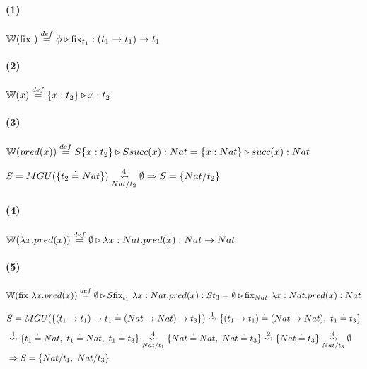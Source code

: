 \documentclass[10pt,a4paper]{article}
\begin{document}
\vspace*{5mm}
\begin{multicols}{2}
\paragraph{(1)} $\WFunc(\lambdaFix{}) \equalDef \judgeType{\phi}{\text{fix}_{t_1}}{(t_1\to t_1)\to t_1}$

\paragraph{(2)} $\WFunc(x) \equalDef \judgeType{\{x:t_2\}}{x}{t_2}$

\end{multicols}


\paragraph{(3)} $\WFunc(pred(x)) \equalDef \judgeType{S\{x:t_2\}}{Ssucc(x)}{Nat} = \judgeType{\{x:Nat\}}{succ(x)}{Nat}$

\vspace*{5mm}
$S = MGU(\{t_2\equalDot Nat\}) \goesTo{4}{Nat/t_2}  \emptyset \Rightarrow S=\{Nat/t_2\}$

\paragraph{(4)} 
$\WFunc(\lambdaAbsI{x}{pred(x)})
\equalDef \judgeType{\emptyset}{\lambdaAbs{x}{Nat}{pred(x)}}{Nat\to Nat}$

\paragraph{(5)}$
\WFunc(\lambdaFix{\lambdaAbsI{x}{pred(x)}})
\equalDef \judgeType{\emptyset}{S\text{fix}_{t_1}~\lambdaAbs{x}{Nat}{pred(x)}}{St_3} = \judgeType{\emptyset}{\text{fix}_{Nat}~\lambdaAbs{x}{Nat}{pred(x)}}{Nat}
$

\begin{align*}
\vspace*{5mm}
&S = MGU(\{(t_1\to t_1)\to t_1 \equalDot (Nat\to Nat)\to t_3\}) \goesTo{1}{}  \{(t_1\to t_1)\equalDot (Nat\to Nat),~t_1 \equalDot  t_3\} \\
&\goesTo{1}{}  \{t_1\equalDot Nat,~ t_1\equalDot Nat,~t_1 \equalDot  t_3\}  
\goesTo{4}{Nat/t_1}  \{Nat \equalDot Nat,~Nat \equalDot  t_3\} \goesTo{2}{}  \{Nat \equalDot  t_3\} \goesTo{4}{Nat/t_3}  \emptyset \\
&\Rightarrow S=\{Nat/t_1,~Nat/t_3\}
\end{align*}
\end{document}
